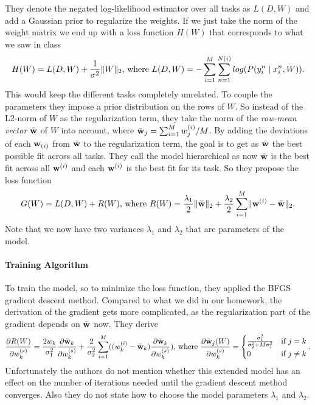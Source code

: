 They denote the negated log-likelihood estimator over all tasks as $L(D,W)$ and add a Gaussian prior to regularize the weights. If we just take the norm of the weight matrix we end up with a loss function $H(W)$ that corresponds to what we saw in class
\begin{align*}
H(W) = L(D,W) + \frac{1}{\sigma^2} \lVert W\rVert_2 \text{, where } L(D,W) = -\sum_{i=1}^{M} \sum_{n=1}^{N(i)} log(P(y_i^n \mid x_i^n, W)).
\end{align*}
This would keep the different tasks completely unrelated. To couple the parameters they impose a prior distribution on the rows of $W$. So instead of the L2-norm of $W$ as the regularization term, they take the norm of the \emph{row-mean vector} $\bar{\textbf{w}}$ of $W$ into account, where $\bar{\textbf{w}}_j = \sum_{i=1}^M w_{j}^{(i)}/M$.
By adding the deviations of each $\textbf{w}_{(i)}$ from $\bar{\textbf{w}}$ to the regularization term, the goal is to get as $\bar{\textbf{w}}$ the best possible fit across all tasks. They call the model hierarchical as now $\bar{\textbf{w}}$ is the best fit across all $\textbf{w}^{(i)}$ and each $\textbf{w}^{(i)}$ is the best fit for its task. So they propose the loss function
\begin{align*}
G(W) = L(D,W) + R(W) \text{, where } R(W) = \frac{\lambda_1}{2} \lVert\bar{\textbf{w}}\rVert_2 + \frac{\lambda_2}{2} \sum_{i=1}^M \lVert\textbf{w}^{(i)} - \bar{\textbf{w}}\rVert_2.
\end{align*}
Note that we now have two variances $\lambda_1$ and $\lambda_2$ that are parameters of the model.

\paragraph{Training Algorithm}
To train the model, so to minimize the loss function, they applied the BFGS gradient descent method. Compared to what we did in our homework, the derivation of the gradient gets more complicated, as the regularization part of the gradient depends on $\bar{\textbf{w}}$ now. They derive
\begin{align*}
\frac{\partial R(W)}{\partial w_k^{(s)}} = \frac{2 w_k}{\sigma_1^2}\frac{\partial \bar{\textbf{w}}_k}{\partial w_k^{(s)}} + \frac{2}{\sigma_2^2} \sum_{i=1}^{M}((w_k^{(i)} - \bar{\textbf{w}}_k)\frac{\partial\bar{\textbf{w}}_k}{\partial w_k^{(s)}}) \text{, where } \frac{\partial \bar{\textbf{w}}_j(W)}{\partial w_k^{(s)}} = \begin{cases} \frac{\sigma_1^2}{\sigma_2^2 + M\sigma_1^2} & \text{if } j=k\\
0 & \text{if } j\neq k
\end{cases}.
\end{align*}
Unfortunately the authors do not mention whether this extended model has an effect on the number of iterations needed until the gradient descent method converges. Also they do not state how to choose the model parameters $\lambda_1$ and $\lambda_2$.
